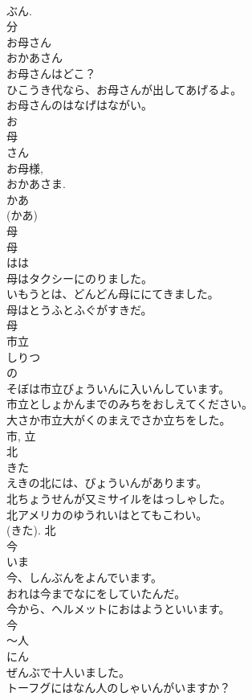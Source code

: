 \documentclass[8pt]{extreport}
\begin{document}
\begin{CJK}{UTF8}{min}
\\	ぶん. 
\\	分	
\\	お母さん	
\\	おかあさん	
\\	お母さんはどこ？	
\\	ひこうき代なら、お母さんが出してあげるよ。	
\\	お母さんのはなげはながい。	
\\	お 
\\	母 
\\	さん 
\\	お母様, 
\\	おかあさま. 
\\	かあ 
\\	(かあ) 
\\	母	
\\	母	
\\	はは	
\\	母はタクシーにのりました。	
\\	いもうとは、どんどん母ににてきました。	
\\	母はとうふとふぐがすきだ。	
\\	母	
\\	市立	
\\	しりつ	
\\	の 
\\	そぼは市立びょういんに入いんしています。	
\\	市立としょかんまでのみちをおしえてください。	
\\	大さか市立大がくのまえでさか立ちをした。	
\\	市, 立	
\\	北	
\\	きた	
\\	えきの北には、びょういんがあります。	
\\	北ちょうせんが又ミサイルをはっしゃした。	
\\	北アメリカのゆうれいはとてもこわい。	
\\	(きた).	北	
\\	今	
\\	いま	
\\	今、しんぶんをよんでいます。	
\\	おれは今までなにをしていたんだ。	
\\	今から、ヘルメットにおはようといいます。	
\\	今	
\\	〜人	
\\	にん	
\\	ぜんぶで十人いました。	
\\	トーフグにはなん人のしゃいんがいますか？	

\end{CJK}
\end{document}
